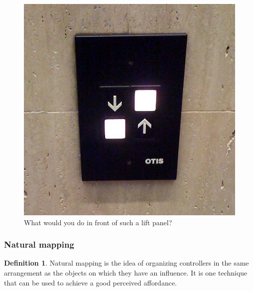 \documentclass[a4paper,11pt] {article}
\theoremstyle{definition}
\newtheorem{defn}{Definition}[section]
\begin{document}
\begin{figure}[h]
\centering
\includegraphics[scale=0.20]{fig-report/bad-switches.jpg}
\caption{What would you do in front of such a lift panel?}
\label{fig:lift-bad-design}
\end{figure}

    \subsubsection{Natural mapping}
\begin{defn}
Natural mapping is the idea of organizing controllers in the same arrangement as the objects on which they have an influence. It is one technique that can be used to achieve a good perceived affordance.
\end{defn}
\end{document}

